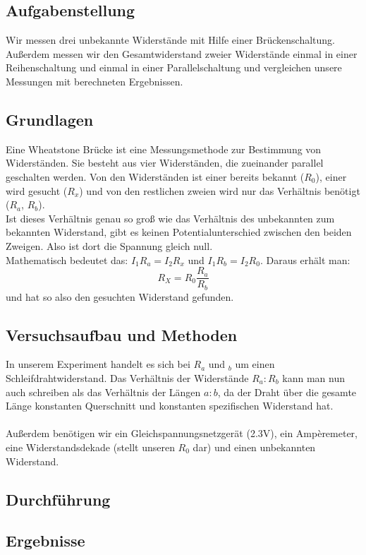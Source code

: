 \documentclass{article}
\begin{document}
\subsection{Aufgabenstellung}
Wir messen drei unbekannte Widerstände mit Hilfe einer Brückenschaltung.
Außerdem messen wir den Gesamtwiderstand zweier Widerstände einmal in einer Reihenschaltung und einmal in einer Parallelschaltung und vergleichen unsere Messungen mit berechneten Ergebnissen.
\subsection{Grundlagen}
Eine Wheatstone Brücke ist eine Messungsmethode zur Bestimmung von Widerständen. Sie besteht aus vier Widerständen, die zueinander parallel geschalten werden. 
Von den Widerständen ist einer bereits bekannt ($R_0$), einer wird gesucht ($R_x$) und von den restlichen zweien wird nur das Verhältnis benötigt ($R_a$, $R_b$).\\
Ist dieses Verhältnis genau so groß wie das Verhältnis des unbekannten zum bekannten Widerstand, gibt es keinen Potentialunterschied zwischen den beiden Zweigen. Also ist dort die Spannung gleich null.\\
Mathematisch bedeutet das: $I_1 R_a = I_2 R_x$ und $I_1 R_b = I_2 R_0$. Daraus erhält man: \\
$$R_X=R_0 \frac{R_a}{R_b}$$
und hat so also den gesuchten Widerstand gefunden. 
 
\subsection{Versuchsaufbau und Methoden}
In unserem Experiment handelt es sich bei $R_a$ und $_b$ um einen Schleifdrahtwiderstand. Das Verhältnis der Widerstände $R_a : R_b$ kann man nun auch schreiben als das Verhältnis der Längen $a : b$, da der Draht über die gesamte Länge konstanten Querschnitt und konstanten spezifischen Widerstand hat.\\
\\
Außerdem benötigen wir ein Gleichspannungsnetzgerät (2.3V), ein Ampèremeter, eine Widerstandsdekade (stellt unseren $R_0$ dar) und einen unbekannten Widerstand. 

\subsection{Durchführung}
\subsection{Ergebnisse}
\end{document}
